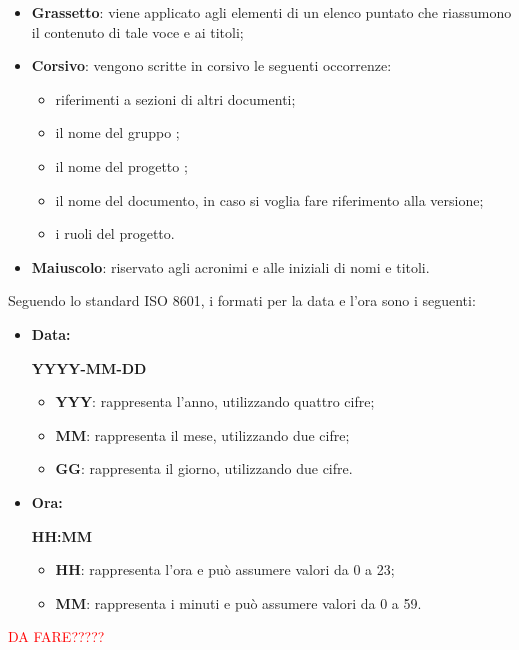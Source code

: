 \begin{itemize}
	\item \textbf{Grassetto}: viene applicato agli elementi di un elenco puntato che riassumono il contenuto di tale voce e ai titoli;
	\item \textbf{Corsivo}: vengono scritte in corsivo le seguenti occorrenze:
	\begin{itemize}
		\item riferimenti a sezioni di altri documenti;
		\item il nome del gruppo \Omicron ;
		\item il nome del progetto \nameproject ;
		\item il nome del documento, in caso si voglia fare riferimento alla versione;
		\item i ruoli del progetto.
	\end{itemize}
	\item \textbf{Maiuscolo}: riservato agli acronimi e alle iniziali di nomi e titoli.
\end{itemize}

Seguendo lo standard ISO 8601, i formati per la data e l'ora sono i seguenti:
\begin{itemize}
	\item \textbf{Data:}
		\begin{center}
			\textbf{YYYY-MM-DD}
		\end{center}
		\begin{itemize}
			\item \textbf{YYY}: rappresenta l'anno, utilizzando quattro cifre;
			\item \textbf{MM}: rappresenta il mese, utilizzando due cifre;
			\item \textbf{GG}: rappresenta il giorno, utilizzando due cifre.
		\end{itemize}
	\item \textbf{Ora:}
		\begin{center}
			\textbf{HH:MM}
		\end{center}
		\begin{itemize}
			\item \textbf{HH}: rappresenta l'ora e può assumere valori da 0 a 23;
			\item \textbf{MM}: rappresenta i minuti e può assumere valori da 0 a 59.
		\end{itemize}
\end{itemize}

\textcolor{red}{DA FARE?????}